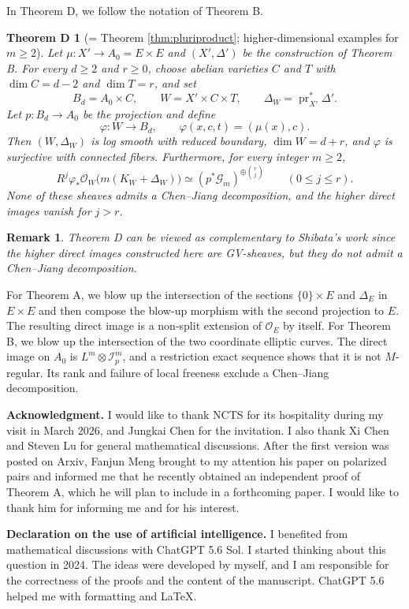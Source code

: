 \documentclass[11pt,letterpaper]{article}
\theoremstyle{paper}
\newtheorem{remark}[theorem]{Remark}
\newtheorem*{theoremD}{Theorem D}
\newcommand{\OO}{\mathcal O}
\newcommand{\GG}{\mathcal G}
\newcommand{\II}{\mathcal I}
\DeclareMathOperator{\pr}{pr}
\begin{document}
In Theorem D, we follow the notation of Theorem B.

\begin{theoremD}[= Theorem \ref{thm:pluriproduct}; higher-dimensional examples for $m\ge2$]
Let $\mu:X'\to A_0=E\times E$ and $(X',\Delta')$ be the construction of Theorem B. For every $d\ge2$ and $r\ge0$, choose abelian varieties $C$ and $T$ with $\dim C=d-2$ and $\dim T=r$, and set
\[
B_d=A_0\times C,\qquad W=X'\times C\times T,\qquad\Delta_W=\pr_{X'}^*\Delta'.
\]
Let $p:B_d\to A_0$ be the projection and define
\[
\varphi:W\longrightarrow B_d,\qquad\varphi(x,c,t)=(\mu(x),c).
\]
Then $(W,\Delta_W)$ is log smooth with reduced boundary, $\dim W=d+r$, and $\varphi$ is surjective with connected fibers. Furthermore, for every integer $m\ge2$,
\[
R^j\varphi_*\OO_W\bigl(m(K_W+\Delta_W)\bigr)
\simeq(p^*\GG_m)^{\oplus\binom rj}\qquad(0\le j\le r).
\]
None of these sheaves admits a Chen--Jiang decomposition, and the higher direct images vanish for $j>r$.
\end{theoremD}
\begin{remark}
Theorem D can be viewed as complementary to Shibata's work since the higher direct images constructed here are GV-sheaves, but they do not admit a Chen--Jiang decomposition.
\end{remark}
For Theorem A, we blow up the intersection of the sections $\{0\}\times E$ and $\Delta_E$ in $E\times E$ and then compose the blow-up morphism with the second projection to $E$. The resulting direct image is a non-split extension of $\OO_E$ by itself. For Theorem B, we blow up the intersection of the two coordinate elliptic curves. The direct image on $A_0$ is $L^m\otimes\II_p^m$, and a restriction exact sequence shows that it is not $M$-regular. Its rank and failure of local freeness exclude a Chen--Jiang decomposition.

\noindent\textbf{Acknowledgment.} I would like to thank NCTS for its hospitality during my visit in March 2026, and Jungkai Chen for the invitation. I also thank Xi Chen and Steven Lu for general mathematical discussions. After the first version was posted on Arxiv, Fanjun Meng brought to my attention his paper \cite{MengAdjoint} on polarized pairs and informed me that he recently obtained an independent proof of Theorem A, which he will plan to include in a forthcoming paper. I would like to thank him for informing me and for his interest.

\noindent\textbf{Declaration on the use of artificial intelligence.} I benefited from mathematical discussions with ChatGPT 5.6 Sol. I started thinking about this question in 2024. The ideas were developed by myself, and I am responsible for the correctness of the proofs and the content of the manuscript. ChatGPT 5.6 helped me with formatting and LaTeX.
\end{document}
